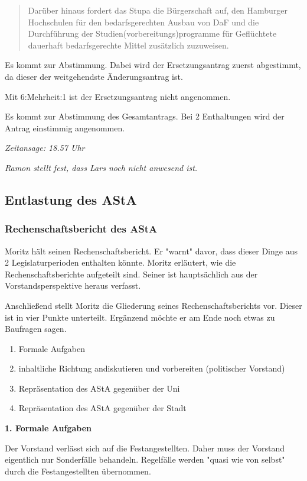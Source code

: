 \documentclass[ngerman,headheight=70pt]{scrartcl}
\begin{document}
    \blockquote{Darüber hinaus fordert das Stupa die Bürgerschaft auf, den Hamburger
    Hochschulen für den bedarfsgerechten Ausbau von DaF und die Durchführung
    der Studien(vorbereitungs)programme für Geflüchtete
    dauerhaft bedarfsgerechte Mittel zusätzlich zuzuweisen.}

    Es kommt zur Abstimmung. Dabei wird der Ersetzungsantrag zuerst abgestimmt,
    da dieser der weitgehendste Änderungsantrag ist.

    Mit 6:Mehrheit:1 ist der Ersetzungsantrag nicht angenommen.

    Es kommt zur Abstimmung des Gesamtantrags. Bei 2 Enthaltungen wird
    der Antrag einstimmig angenommen.

    \textit{Zeitansage: 18.57 Uhr}

    \textit{Ramon stellt fest, dass Lars noch nicht anwesend ist.}

    \subsection{Entlastung des AStA}

    \subsubsection{Rechenschaftsbericht des AStA}

    Moritz hält seinen Rechenschaftsbericht. Er "warnt" davor, dass dieser
    Dinge aus 2 Legislaturperioden enthalten könnte.
    Moritz erläutert, wie die Rechenschaftsberichte aufgeteilt sind. Seiner
    ist hauptsächlich aus der Vorstandsperspektive heraus verfasst.

    Anschließend stellt Moritz die Gliederung seines Rechenschaftsberichts
    vor. Dieser ist in vier Punkte unterteilt. Ergänzend möchte er am Ende noch
    etwas zu Baufragen sagen.

    \begin{enumerate}
        \item Formale Aufgaben
        \item inhaltliche Richtung andiskutieren und vorbereiten (politischer
        Vorstand)
        \item Repräsentation des AStA gegenüber der Uni
        \item Repräsentation des AStA gegenüber der Stadt
    \end{enumerate}

    \textbf{1. Formale Aufgaben}

    Der Vorstand verlässt sich auf die Festangestellten. Daher muss der Vorstand
    eigentlich nur Sonderfälle behandeln. Regelfälle werden "quasi wie von selbst"
    durch die Festangestellten übernommen.
\end{document}
